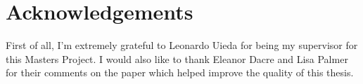 \section*{Acknowledgements}

First of all, I'm extremely grateful to Leonardo Uieda for being my supervisor for this Masters Project. I would also like to thank Eleanor Dacre and Lisa Palmer for their comments on the paper which helped improve the quality of this thesis.
